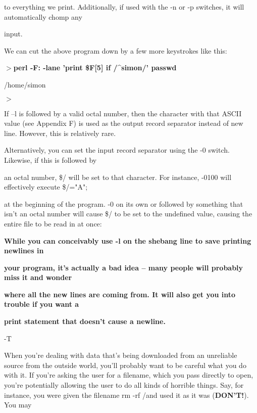 \documentclass[a4paper,11pt]{book}
\begin{document}
\noindent to everything we print. Additionally, if used with the -n or -p switches, it will automatically chomp any

\noindent input.

\noindent 

\noindent We can cut the above program down by a few more keystrokes like this:

\noindent 

\noindent $>$\textbf{perl -F: -lane 'print \$F[5] if /\^{}simon/' passwd}

\noindent /home/simon

\noindent $>$

\noindent 

\noindent If --l is followed by a valid octal number, then the character with that ASCII value (see Appendix F) is used as the output record separator instead of new line. However, this is relatively rare.

\noindent 

\noindent Alternatively, you can set the input record separator using the -0 switch. Likewise, if this is followed by

\noindent an octal number, \$/ will be set to that character. For instance, -0100 will effectively execute \$/="A";

\noindent at the beginning of the program. -0 on its own or followed by something that isn't an octal number will cause \$/ to be set to the undefined value, causing the entire file to be read in at once:

\noindent 

\noindent 

\noindent \textbf{While you can conceivably use -l on the shebang line to save printing newlines in}

\noindent \textbf{your program, it's actually a bad idea -- many people will probably miss it and wonder}

\noindent \textbf{where all the new lines are coming from. It will also get you into trouble if you want a}

\noindent \textbf{print statement that doesn't cause a newline.}

\noindent 

\noindent 

\noindent -T

\noindent 

\noindent When you're dealing with data that's being downloaded from an unreliable source from the outside world, you'll probably want to be careful what you do with it. If you're asking the user for a filename, which you pass directly to open, you're potentially allowing the user to do all kinds of horrible things. Say, for instance, you were given the filename rm -rf /\textbar  and used it as it was (\textbf{DON'T!}). You may
\end{document}
